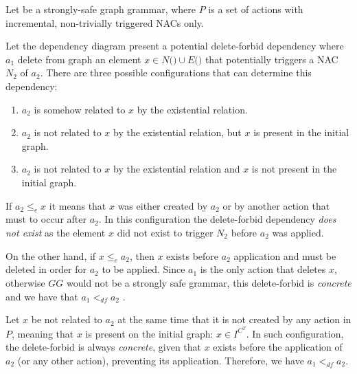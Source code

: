 \begin{definition} Let \doublyTypedGraphGrammarCore{} be a strongly-safe graph grammar, where $P$ is a set of actions with incremental, non-trivially triggered NACs only.


\hfill

  Let the dependency diagram present a potential delete-forbid dependency where $a_1$ delete from graph \coreGraph{} an element $x \in N($\coreGraph$) \cup E($\coreGraph$)$ that potentially triggers a NAC $N_2$ of $a_2$. There are three possible configurations that can determine this dependency:

\begin{enumerate}
  \item $a_2$ is somehow related to $x$ by the existential relation.
  \item $a_2$ is not related to $x$ by the existential relation, but $x$ is present in the initial graph.
  \item $a_2$ is not related to $x$ by the existential relation and $x$ is not present in the initial graph.
\end{enumerate}

  \begin{description}[style=nextline]
  \item [Related element:] If $a_2 \leq_e x$ it means that $x$ was either created by $a_2$ or by another action that must to occur after $a_2$. In this configuration the delete-forbid dependency \emph{does not exist} as the element $x$ did not exist to trigger $N_2$ before $a_2$ was applied. 

On the other hand, if $x \leq_e a_2$, then $x$ exists before $a_2$ application and must be deleted in order for $a_2$ to be applied. Since $a_1$ is the only action that deletes $x$, otherwise $GG$ would not be a strongly safe grammar, this delete-forbid is \emph{concrete} and we have that $a_1 <_{df} a_2$ .

\item [Unrelated element present on the initial graph:]
Let $x$ be not related to $a_2$ at the same time that it is not created by any action in $P$, meaning that $x$ is present on the initial graph: $x \in I^{C^T}$. In such configuration, the delete-forbid is always \emph{concrete}, given that $x$ exists before the application of $a_2$ (or any other action), preventing its application. Therefore, we have $a_1 <_{df} a_2$.


\end{description}
\end{definition}
